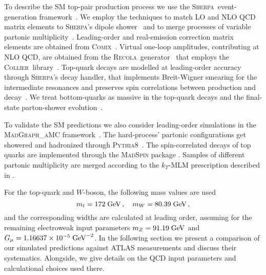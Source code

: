 \documentclass[aps,prd,amsmath,amssymb,superscriptaddress, preprintnumbers,preprint,nofootinbib,a4paper]{revtex4}
\makeatletter
\def\Sherpa{\textsc{Sherpa}}
\def\Comix{\textsc{Comix}}
\def\Recola{\textsc{Recola}}
\def\Collier{\textsc{Collier}}
\def\mg5{\textsc{MadGraph\_aMC\@NLO}}
\def\Pythia8{\textsc{Pythia8}}
\newcommand{\com}[1]{{\color{red}{ #1 }}}
\makeatother
\begin{document}
To describe the SM top-pair production process we use the \Sherpa\ event-generation
framework~\cite{Gleisberg:2003xi,Gleisberg:2008ta}. We employ the techniques to match LO and NLO QCD matrix
elements to \Sherpa's dipole shower~\cite{Schumann:2007mg} and to merge processes of variable partonic
multiplicity~\cite{Hoeche:2009rj,Hoeche:2012yf}. Leading-order and real-emission correction matrix elements
are obtained from \Comix~\cite{Gleisberg:2008fv}. Virtual one-loop amplitudes, contributing at NLO QCD, are
obtained from the \Recola\ generator~\cite{Actis:2016mpe,Biedermann:2017yoi} that employs the \Collier\
library~\cite{Denner:2016kdg}. Top-quark decays are modelled at leading-order accuracy through \Sherpa's
decay handler, that implements Breit-Wigner smearing for the intermediate resonances and preserves spin
correlations between production and decay~\cite{Hoche:2014kca}. We treat bottom-quarks as
massive in the top-quark decays and the final-state parton-shower evolution~\cite{Krauss:2016orf}.

To validate the SM predictions we also consider leading-order simulations in the \mg5 framework~\cite{Alwall:2014hca}.
The hard-process' partonic configurations get showered and hadronized through \Pythia8~\cite{Sjostrand:2014zea}.
The spin-correlated decays of top quarks are implemented through the \textsc{MadSpin} package \cite{Artoisenet:2012st}.
Samples of different partonic multiplicity are merged according to the $k_T$-MLM prescription described in \cite{Alwall:2007fs}.

For the top-quark and $W$-boson, the following mass values are used
%
\begin{equation}
  m_t=172\;{\rm GeV}\,,\quad m_W=80.39\;{\rm GeV}\,,
\end{equation}
%
and the corresponding widths are calculated at leading order, assuming for the remaining electroweak input parameters
$m_Z=91.19\;{\rm GeV}$ and $G_\mu=1.16637\times 10^{-5}\;{\rm GeV}^{-2}$. In the following section
we present a comparison of our simulated predictions against ATLAS measurements and discuss their systematics. Alongside, we give details on the QCD input parameters and calculational choices used there. 
%
\end{document}

